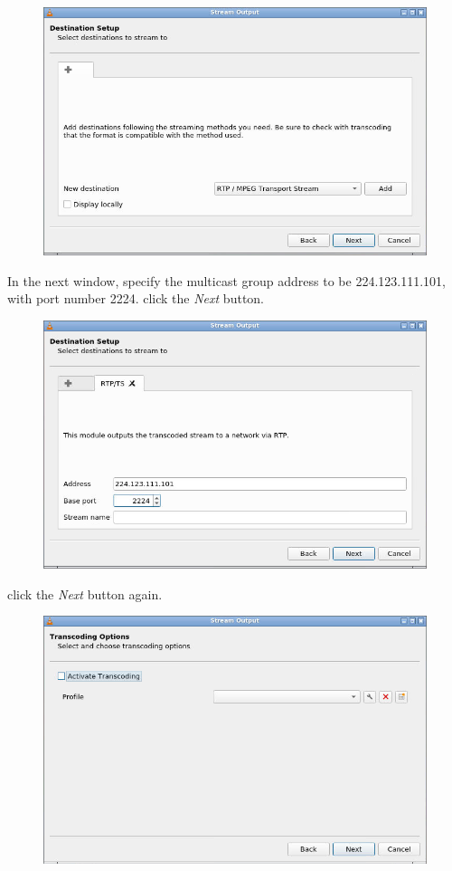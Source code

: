 \documentclass{../UTNetLab}
\begin{document}
\begin{figure}[H]
    \centering
    \includegraphics[scale=1.8]{img/stream2}
\end{figure}
In the next window, specify the multicast group address to be {224.123.111.101}, with port number {2224}.
click the \textit{Next} button.
\begin{figure}[H]
    \centering
    \includegraphics[scale=1.8]{img/stream3}
\end{figure}
click the \textit{Next} button again.
\begin{figure}[H]
    \centering
    \includegraphics[scale=1.8]{img/stream4}
\end{figure}
\end{document}
